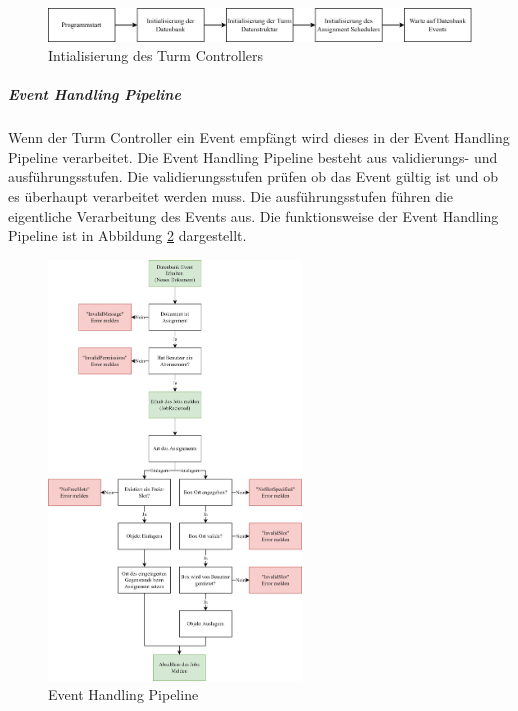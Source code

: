 \begin{figure}[H]
  \centering
  \includegraphics[width=1\textwidth]{images/tower_controller_v4_init.png}
  \caption{Intialisierung des Turm Controllers}
  \label{fig:tower_controller_v4_init}
\end{figure}

\clearpage

\subparagraph{Event Handling Pipeline}

Wenn der Turm Controller ein Event empfängt wird dieses in der Event Handling Pipeline verarbeitet. Die Event Handling Pipeline besteht aus validierungs- und ausführungsstufen. Die validierungsstufen prüfen ob das Event gültig ist und ob es überhaupt verarbeitet werden muss. Die ausführungsstufen führen die eigentliche Verarbeitung des Events aus. Die funktionsweise der Event Handling Pipeline ist in Abbildung \ref{fig:tower_controller_v4_event_handling} dargestellt.

\begin{figure}[H]
  \centering
  \includegraphics[width=0.6\textwidth]{images/tower_controller_v4_event_handling.png}
  \caption{Event Handling Pipeline}
  \label{fig:tower_controller_v4_event_handling}
\end{figure}

